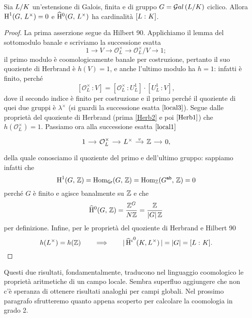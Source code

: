 \begin{theorem} \label{assioma}
	Sia $ L/K $ un'estensione di Galois, finita e di gruppo $ G = \mathcal{G}al\left( L/K \right) $ ciclico. Allora $ \operatorname{H}^1(G, \, L^\times) = 0 $ e $ \operatorname{\widehat{H}^{0}}(G, \, L^\times) $ ha cardinalità $ [L \, \colon K] $.
\end{theorem}
\begin{proof}
	La prima asserzione segue da Hilbert 90. Applichiamo il lemma del sottomodulo banale e scriviamo la successione esatta 
	\[ 1 \to V \to \mathcal{O}_L^\times \to \mathcal{O}_L^\times/V \to 1; \]
	il primo modulo è coomologicamente banale per costruzione, pertanto il suo quoziente di Herbrand è $ h(V) = 1 $, e anche l'ultimo modulo ha $ h = 1 $: infatti è finito, perché $$  [\mathcal{O}_L^\times \, \colon V] = [\mathcal{O}_L^\times \,\colon U_L^1]\cdot[U_L^1 \,\colon V],  $$
	dove il secondo indice è finito per costruzione e il primo perché il quoziente di quei due gruppi è $ \lambda^\times $ (si guardi la successione esatta $ \eqref{local3} $). Segue dalle proprietà del quoziente di Herbrand (prima \ref{Herb2} e poi $ \ref{Herb1} $) che $ h(\mathcal{O}_L^\times) = 1 $. Passiamo ora alla successione esatta $ \eqref{local1} $
	\[ \begin{tikzcd}[column sep = small]
	1 \rar
	& \mathcal{O}_{L}^\times \rar
	& L^\times \rar["v"]
	& \Z \rar
	& 0,
	\end{tikzcd} \]
	della quale conosciamo il quoziente del primo e dell'ultimo gruppo: sappiamo infatti che
	$$  \operatorname{H}^1(G, \, \mathbb{Z}) = \operatorname{Hom}_\mathsf{Gr}(G, \, \mathbb{Z}) = \operatorname{Hom}_{\mathbb{Z}}(G^\texttt{ab}, \, \mathbb{Z}) = 0  $$ perché $ G $ è finito e agisce banalmente su $ \mathbb{Z} $ e che
	$$  \operatorname{\widehat{H}^{0}}(G, \, \mathbb{Z}) = \frac{\mathbb{Z}^G}{ N\mathbb{Z}} = \frac{\mathbb{Z}}{ |G|\, \mathbb{Z}}  $$ per definizione. Infine, per le proprietà del quoziente di Herbrand e Hilbert 90
	\[ h(L^\times) = h(\mathbb{Z}) \qquad\Longrightarrow\qquad |\operatorname{\widehat{H}^\mathnormal{i}}^0(K, L^\times)\, | = |G| = [L \, \colon K]. \]
\end{proof}

Questi due risultati, fondamentalmente, traducono nel linguaggio coomologico le proprietà aritmetiche di un campo locale. Sembra superfluo aggiungere che non c'è speranza di ottenere risultati analoghi per campi globali. Nel prossimo paragrafo sfrutteremo quanto appena scoperto per calcolare la coomologia in grado 2.

